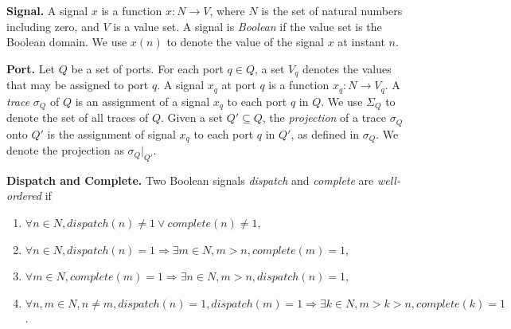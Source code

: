 {\bf Signal.}
A signal $x$ is a function $x: N \rightarrow V$, where $N$ is the set of natural numbers including zero, and $V$ is a value set. 
A signal is \emph{Boolean} if the value set is the Boolean domain.
We use $x(n)$ to denote the value of the signal $x$ at instant $n$. 

{\bf Port.}
Let $Q$  be a set of ports. 
For each port $q \in Q$, a set $V_q$ denotes the values that may be assigned to port $q$. %
A signal $x_q$ at port $q$ is a function $x_q: N \rightarrow V_q$.
A \emph{trace} $\sigma_Q$ of $Q$ is an assignment of a signal $x_q$ to each port $q$ in $Q$.
We use $\Sigma_Q$ to denote the set of all traces of $Q$.
Given a set $Q' \subseteq Q$, the \emph{projection} of a trace $\sigma_Q$ onto $Q'$ is the assignment of signal $x_q$ to each port $q$ in $Q'$, as defined in $\sigma_Q$. We denote the projection as $\sigma_Q|_{Q'}$.
 
{\bf Dispatch and Complete.}
Two Boolean signals \emph{dispatch} and \emph{complete} are \emph{well-ordered} if 

\begin{enumerate}
	\item $\forall n \in N, dispatch(n) \ne 1 \vee complete(n) \ne 1 $,
	\item $ \forall n\in N, dispatch(n) = 1 \Rightarrow \exists m\in N, m > n, complete(m) =  1 $,
	\item $ \forall m\in N, complete(m) = 1 \Rightarrow \exists n\in N, m > n, dispatch(n) =  1 $,
	\item $ \forall n,m\in N, n \neq m, dispatch(n) = 1, dispatch(m) = 1 \Rightarrow \exists k\in N, m >k> n, complete(k) = 1 $.
\end{enumerate}

